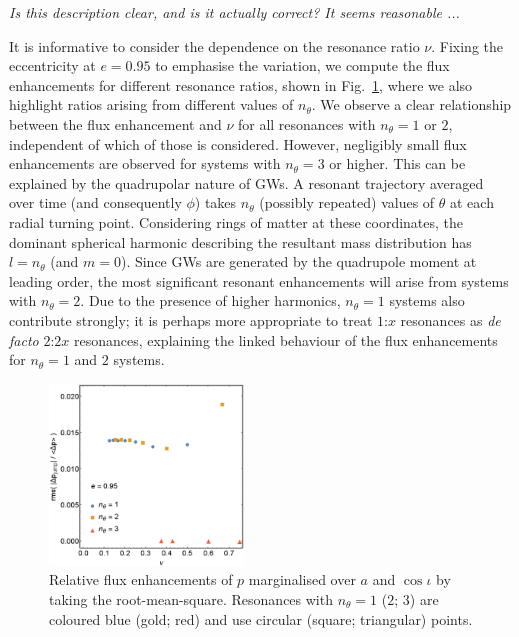 \documentclass[aps,prd,amsfonts,amssymb,amsmath,nofootinbib,showpacs,superscriptaddress,twocolumn]{revtex4}
\newcommand{\figref}[1]{Fig.~\ref{fig:#1}}
\begin{document}
\emph{Is this description clear, and is it actually correct? It seems reasonable ...}

It is informative to consider the dependence on the resonance ratio $\nu$. Fixing the eccentricity at $e=0.95$ to emphasise the variation, we compute the flux enhancements for different resonance ratios, shown in \figref{res-flux-rms-p-vsnu}, where we also highlight ratios arising from different values of $n_\theta$. We observe a clear relationship between the flux enhancement and $\nu$ for all resonances with $n_\theta = 1$ or $2$, independent of which of those is considered. However, negligibly small flux enhancements are observed for systems with $n_\theta = 3$ or higher. This can be explained by the quadrupolar nature of GWs. A resonant trajectory averaged over time (and consequently $\phi$) takes $n_\theta$ (possibly repeated) values of $\theta$ at each radial turning point. Considering rings of matter at these coordinates, the dominant spherical harmonic describing the resultant mass distribution has $l=n_\theta$ (and $m=0$). Since GWs are generated by the quadrupole moment at leading order, the most significant resonant enhancements will arise from systems with $n_\theta = 2$. Due to the presence of higher harmonics, $n_\theta = 1$ systems also contribute strongly; it is perhaps more appropriate to treat $1$:$x$ resonances as \emph{de facto} $2$:$2x$ resonances, explaining the linked behaviour of the flux enhancements for $n_\theta = 1$ and $2$ systems.

\begin{figure}
\centering
\includegraphics[width=0.46\textwidth]{res_flux_rms_p_e095}
\caption{\label{fig:res-flux-rms-p-vsnu}Relative flux enhancements of $p$ marginalised over $a$ and $\cos\iota$ by taking the root-mean-square. Resonances with $n_\theta = 1$ ($2$; $3$) are coloured blue (gold; red) and use circular (square; triangular) points.}
\end{figure}
\end{document}
